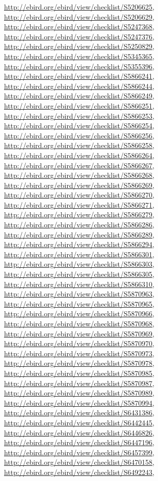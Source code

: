 \documentclass[9pt, article]{memoir}
\begin{document}
\begin{multicols}{2}
\url{http://ebird.org/ebird/view/checklist/S5206625}, 
\url{http://ebird.org/ebird/view/checklist/S5206629}, 
\url{http://ebird.org/ebird/view/checklist/S5247368}, 
\url{http://ebird.org/ebird/view/checklist/S5247376}, 
\url{http://ebird.org/ebird/view/checklist/S5250829}, 
\url{http://ebird.org/ebird/view/checklist/S5345365}, 
\url{http://ebird.org/ebird/view/checklist/S5355396}, 
\url{http://ebird.org/ebird/view/checklist/S5866241}, 
\url{http://ebird.org/ebird/view/checklist/S5866244}, 
\url{http://ebird.org/ebird/view/checklist/S5866249}, 
\url{http://ebird.org/ebird/view/checklist/S5866251}, 
\url{http://ebird.org/ebird/view/checklist/S5866253}, 
\url{http://ebird.org/ebird/view/checklist/S5866254}, 
\url{http://ebird.org/ebird/view/checklist/S5866256}, 
\url{http://ebird.org/ebird/view/checklist/S5866258}, 
\url{http://ebird.org/ebird/view/checklist/S5866264}, 
\url{http://ebird.org/ebird/view/checklist/S5866267}, 
\url{http://ebird.org/ebird/view/checklist/S5866268}, 
\url{http://ebird.org/ebird/view/checklist/S5866269}, 
\url{http://ebird.org/ebird/view/checklist/S5866270}, 
\url{http://ebird.org/ebird/view/checklist/S5866271}, 
\url{http://ebird.org/ebird/view/checklist/S5866279}, 
\url{http://ebird.org/ebird/view/checklist/S5866286}, 
\url{http://ebird.org/ebird/view/checklist/S5866289}, 
\url{http://ebird.org/ebird/view/checklist/S5866294}, 
\url{http://ebird.org/ebird/view/checklist/S5866301}, 
\url{http://ebird.org/ebird/view/checklist/S5866303}, 
\url{http://ebird.org/ebird/view/checklist/S5866305}, 
\url{http://ebird.org/ebird/view/checklist/S5866310}, 
\url{http://ebird.org/ebird/view/checklist/S5870963}, 
\url{http://ebird.org/ebird/view/checklist/S5870965}, 
\url{http://ebird.org/ebird/view/checklist/S5870966}, 
\url{http://ebird.org/ebird/view/checklist/S5870968}, 
\url{http://ebird.org/ebird/view/checklist/S5870969}, 
\url{http://ebird.org/ebird/view/checklist/S5870970}, 
\url{http://ebird.org/ebird/view/checklist/S5870973}, 
\url{http://ebird.org/ebird/view/checklist/S5870978}, 
\url{http://ebird.org/ebird/view/checklist/S5870985}, 
\url{http://ebird.org/ebird/view/checklist/S5870987}, 
\url{http://ebird.org/ebird/view/checklist/S5870989}, 
\url{http://ebird.org/ebird/view/checklist/S5870994}, 
\url{http://ebird.org/ebird/view/checklist/S6431386}, 
\url{http://ebird.org/ebird/view/checklist/S6442445}, 
\url{http://ebird.org/ebird/view/checklist/S6446826}, 
\url{http://ebird.org/ebird/view/checklist/S6447196}, 
\url{http://ebird.org/ebird/view/checklist/S6457399}, 
\url{http://ebird.org/ebird/view/checklist/S6470158}, 
\url{http://ebird.org/ebird/view/checklist/S6492243}, 

\end{multicols}
\end{document}
